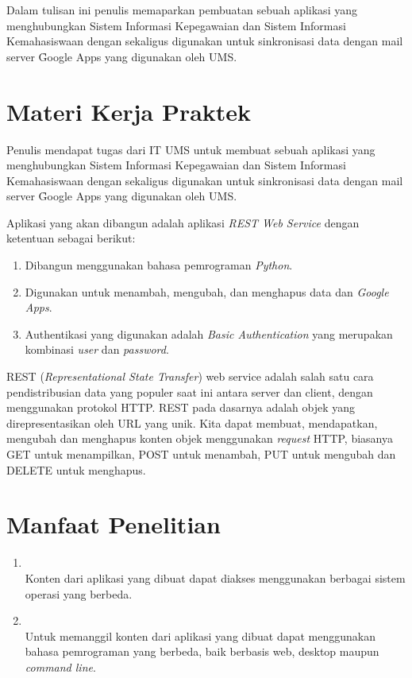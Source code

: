 Dalam tulisan ini penulis memaparkan pembuatan sebuah aplikasi yang menghubungkan Sistem Informasi Kepegawaian dan Sistem Informasi Kemahasiswaan dengan  sekaligus digunakan untuk sinkronisasi data  dengan mail server \f{Google Apps} yang digunakan oleh UMS.

\section{Materi Kerja Praktek}
Penulis mendapat tugas dari IT UMS untuk membuat sebuah aplikasi yang menghubungkan Sistem Informasi Kepegawaian dan Sistem Informasi Kemahasiswaan dengan  sekaligus digunakan untuk sinkronisasi data  dengan mail server \f{Google Apps} yang digunakan oleh UMS.

Aplikasi yang akan dibangun adalah aplikasi \textit{REST Web Service} dengan ketentuan sebagai berikut:
\begin{enumerate}[itemsep=-1ex]
\item Dibangun menggunakan bahasa pemrograman \textit{Python}.
\item Digunakan untuk menambah, mengubah, dan menghapus data  dan \textit{Google Apps}.
\item Authentikasi yang digunakan adalah \textit{Basic Authentication} yang merupakan kombinasi \textit{user} dan \textit{password}.
\end{enumerate}

REST (\textit{Representational State Transfer}) web service adalah salah satu cara pendistribusian data yang populer saat ini antara server dan client, dengan menggunakan protokol HTTP. REST pada dasarnya adalah objek yang direpresentasikan oleh URL yang unik. Kita dapat membuat, mendapatkan, mengubah dan menghapus konten objek menggunakan \textit{request} HTTP, biasanya GET untuk menampilkan, POST untuk menambah, PUT untuk mengubah dan DELETE untuk menghapus.
\section{Manfaat Penelitian}
\begin{enumerate}
\item {}\\
Konten dari aplikasi yang dibuat dapat diakses menggunakan berbagai sistem operasi yang berbeda.

\item {}\\
Untuk memanggil konten dari aplikasi yang dibuat dapat menggunakan bahasa pemrograman yang berbeda, baik berbasis web, desktop maupun \textit{command line}.
\end{enumerate}

